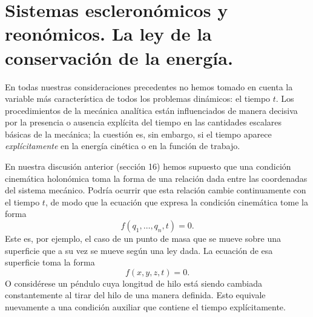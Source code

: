 \documentclass[12pt,a4paper]{book}
\begin{document}
\begin{center}
\begin{center}
\end{center}


\section{Sistemas escleron\'omicos y reon\'omicos. La ley de la conservaci\'on de la energ\'ia.}

En todas nuestras consideraciones precedentes no hemos tomado en cuenta la variable m\'as caracter\'istica de todos los problemas din\'amicos: el tiempo $t$. Los procedimientos de la mec\'anica anal\'itica est\'an influenciados de manera decisiva por la presencia o ausencia expl\'icita del tiempo en las cantidades escalares b\'asicas de la mec\'anica; la cuesti\'on es, sin embargo, si el tiempo aparece \textit{expl\'icitamente} en la energ\'ia cin\'etica o en la funci\'on de trabajo.

En nuestra discusi\'on anterior (secci\'on 16) hemos supuesto que una condici\'on cinem\'atica holon\'omica toma la forma de una relaci\'on dada entre las coordenadas del sistema mec\'anico. Podr\'ia ocurrir que esta relaci\'on cambie continuamente con el tiempo $t$, de modo que la ecuaci\'on que expresa la condici\'on cinem\'atica tome la forma
\begin{equation}
f(q_1, \ldots, q_n, t) = 0.
\tag{18.1}
\end{equation}
Este es, por ejemplo, el caso de un punto de masa que se mueve sobre una superficie que a su vez se mueve seg\'un una ley dada. La ecuaci\'on de esa superficie toma la forma
\begin{equation}
f(x, y, z, t) = 0.
\tag{18.2}
\end{equation}
O consid\'erese un p\'endulo cuya longitud de hilo est\'a siendo cambiada constantemente al tirar del hilo de una manera definida. Esto equivale nuevamente a una condici\'on auxiliar que contiene el tiempo expl\'icitamente.


\end{center}
\end{document}
